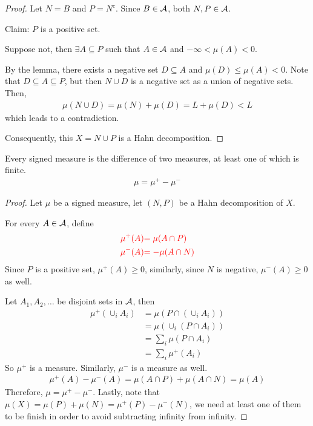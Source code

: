 \documentclass[11pt]{article}
\begin{document}
\begin{theorem}
\begin{proof}
			Let $N = B$ and $P = N^c$. Since $B \in \mathcal{{A}}$, both $N, P \in \mathcal{{A}}$.
			\begin{tcolorbox}
				Claim: $P$ is a positive set.
				
				Suppose not, then $\exists A \subseteq P$ such that $A \in \mathcal{{A}}$ and $-\infty < \mu(A) < 0$.
				
				By the lemma, there exists a negative set $D \subseteq A$ and $\mu(D) \leq \mu(A) < 0$. Note that $D \subseteq A \subseteq P$, but then $N \cup D$ is a negative set as a union of negative sets.
				Then,
				\begin{align}
					\mu(N \cup D) = \mu(N) + \mu(D)
					= L + \mu(D) < L
				\end{align}
				which leads to a contradiction.
			\end{tcolorbox}
			Consequently, this $X = N \cup P$ is a Hahn decomposition.
		\end{proof}
	\end{theorem}
	
	\begin{theorem}
		Every signed measure is the difference of two measures, at least one of which is finite.
		\begin{align}
			\mu = \mu^+ - \mu^-
		\end{align}
		\begin{proof}
			Let $\mu$ be a signed measure, let $(N, P)$ be a Hahn decomposition of $X$.
			
			For every $A \in \mathcal{{A}}$, define
			\begin{align}
				\textcolor{red}{\mu^+(A)} &\textcolor{red}{= \mu(A \cap P)} \\
				\textcolor{red}{\mu^-(A)} &\textcolor{red}{= - \mu(A \cap N)}
			\end{align}
			Since $P$ is a positive set, $\mu^+(A) \geq 0$, similarly, since $N$ is negative, $\mu^-(A) \geq 0$ as well.
			
			Let $A_1, A_2, \dots$ be disjoint sets in $\mathcal{{A}}$, then
			\begin{align}
				\mu^+(\cup_i A_i) &= \mu(P \cap (\cup_i A_i)) \\
				&= \mu(\cup_i (P \cap A_i)) \\
				&= \sum_i \mu(P \cap A_i) \\
				&= \sum_i \mu^+(A_i)
			\end{align}
			So $\mu^+$ is a measure. Similarly, $\mu^-$ is a measure as well.
			\begin{align}
				\mu^+(A) - \mu^-(A) = \mu(A \cap P) + \mu(A \cap N) = \mu(A)
			\end{align}
			Therefore, $\mu = \mu^+ - \mu^-$. Lastly, note that $\mu(X) = \mu(P) + \mu(N) = \mu^+(P) - \mu^-(N)$, we need at least one of them to be finish in order to avoid subtracting infinity from infinity.
		\end{proof}
	\end{theorem}
	
\end{document}
